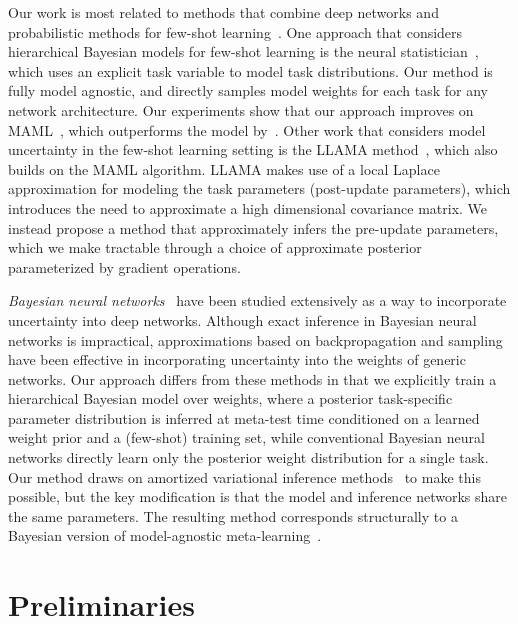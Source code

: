 \documentclass{article}
\begin{document}
Our work is most related to methods that combine deep networks and probabilistic methods for few-shot learning~\cite{edwards2017towards,grant2018recasting,lacoste2017deep}. One approach that considers hierarchical Bayesian models for few-shot learning is the neural statistician~\cite{edwards2017towards}, which uses an explicit task variable to model task distributions. Our method is fully model agnostic, and directly samples model weights for each task for any network architecture. Our experiments show that our approach improves on MAML~\cite{finn2017model}, which  outperforms the model by~\citet{edwards2017towards}.
Other work that considers model uncertainty in the few-shot learning setting is the LLAMA method~\citep{grant2018recasting}, which also builds on the MAML algorithm. LLAMA makes use of a local Laplace approximation for modeling the task parameters (post-update parameters), which introduces the need to approximate a high dimensional covariance matrix.
We instead propose a method that approximately infers the pre-update parameters, which we make tractable through a choice of approximate posterior parameterized by gradient operations. 

\emph{Bayesian neural networks}~\cite{mackay1992practical,hinton1993keeping,neal1995bayesian,barber1998ensemble} have been studied extensively as a way to incorporate uncertainty into deep networks. Although exact inference in Bayesian neural networks is impractical, approximations based on backpropagation and sampling~\cite{graves2011practical,rezende2014stochastic, hoffman2013stochastic, blundell2015weight} have been effective in incorporating uncertainty into the weights of generic networks. Our approach differs from these methods in that we explicitly train a hierarchical Bayesian model over weights, where a posterior task-specific parameter distribution is inferred at meta-test time conditioned on a learned weight prior and a (few-shot) training set, while conventional Bayesian neural networks directly learn only the posterior weight distribution for a single task. Our method draws on amortized variational inference methods~\cite{kingma2013auto,johnson2016composing,shu2018amortized} to make this possible, but the key modification is that the model and inference networks share the same parameters. The resulting method corresponds structurally to a Bayesian version of model-agnostic meta-learning~\cite{finn2017model}.


 
\vspace{-0.4cm}
\section{Preliminaries}
\label{sec:prelim}
\vspace{-0.3cm}
\end{document}
